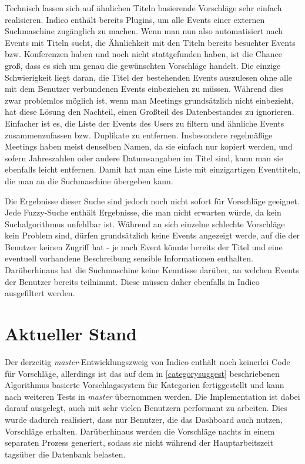 Technisch lassen sich auf ähnlichen Titeln basierende Vorschläge sehr einfach realisieren. Indico
enthält bereits Plugins, um alle Events einer externen Suchmaschine zugänglich zu machen. Wenn man
nun also automatisiert nach Events mit Titeln sucht, die Ähnlichkeit mit den Titeln bereits
besuchter Events bzw. Konferenzen haben und noch nicht stattgefunden haben, ist die Chance groß,
dass es sich um genau die gewünschten Vorschläge handelt. Die einzige Schwierigkeit liegt daran, die
Titel der bestehenden Events auszulesen ohne alle mit dem Benutzer verbundenen Events einbeziehen zu
müssen. Während dies zwar problemlos möglich ist, wenn man Meetings grundsätzlich nicht einbezieht,
hat diese Lösung den Nachteil, einen Großteil des Datenbestandes zu ignorieren. Einfacher ist es,
die Liste der Events des Users zu filtern und ähnliche Events zusammenzufassen bzw. Duplikate zu
entfernen. Insbesondere regelmäßige Meetings haben meist denselben Namen, da sie einfach nur kopiert
werden, und sofern Jahreszahlen oder andere Datumsangaben im Titel sind, kann man sie ebenfalls
leicht entfernen. Damit hat man eine Liste mit einzigartigen Eventtiteln, die man an die
Suchmaschine übergeben kann.

Die Ergebnisse dieser Suche sind jedoch noch nicht sofort für Vorschläge geeignet. Jede Fuzzy-Suche
enthält Ergebnisse, die man nicht erwarten würde, da kein Suchalgorithmus unfehlbar ist. Während an
sich einzelne schlechte Vorschläge kein Problem sind, dürfen grundsätzlich keine Events angezeigt
werde, auf die der Benutzer keinen Zugriff hat - je nach Event könnte bereits der Titel und eine
eventuell vorhandene Beschreibung sensible Informationen enthalten. Darüberhinaus hat die
Suchmaschine keine Kenntisse darüber, an welchen Events der Benutzer bereits teilnimmt. Diese
müssen daher ebenfalls in Indico ausgefiltert werden.


\section{Aktueller Stand}

Der derzeitig \emph{master}-Entwicklungszweig von Indico enthält noch keinerlei Code für Vorschläge,
allerdings ist das auf dem in \autoref{categorysuggest} beschriebenen Algorithmus basierte
Vorschlagssystem für Kategorien fertiggestellt und kann nach weiteren Tests in \emph{master}
übernommen werden. Die Implementation ist dabei darauf ausgelegt, auch mit sehr vielen Benutzern
performant zu arbeiten.  Dies wurde dadurch realisiert, dass nur Benutzer, die das Dashboard auch
nutzen, Vorschläge erhalten. Darüberhinaus werden die Vorschläge nachts in einem separaten Prozess
generiert, sodass sie nicht während der Hauptarbeitszeit tagsüber die Datenbank belasten.

